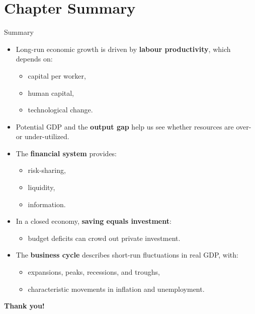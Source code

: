 \documentclass[aspectratio=169]{beamer}
\begin{document}
\section*{Chapter Summary}

\begin{frame}{Summary}
\transfade
\begin{itemize}[<+->]
  \item Long-run economic growth is driven by \textbf{labour productivity}, which depends on:
  \begin{itemize}[<+->]
    \item capital per worker,
    \item human capital,
    \item technological change.
  \end{itemize}
  \item Potential GDP and the \textbf{output gap} help us see whether resources are over- or under-utilized.
  \item The \textbf{financial system} provides:
  \begin{itemize}[<+->]
    \item risk-sharing,
    \item liquidity,
    \item information.
  \end{itemize}
  \item In a closed economy, \textbf{saving equals investment}:
  \begin{itemize}[<+->]
    \item budget deficits can crowd out private investment.
  \end{itemize}
  \item The \textbf{business cycle} describes short-run fluctuations in real GDP, with:
  \begin{itemize}[<+->]
    \item expansions, peaks, recessions, and troughs,
    \item characteristic movements in inflation and unemployment.
  \end{itemize}
\end{itemize}
\end{frame}

\begin{frame}
\centering
\Huge \textbf{Thank you!}
\end{frame}
\end{document}
